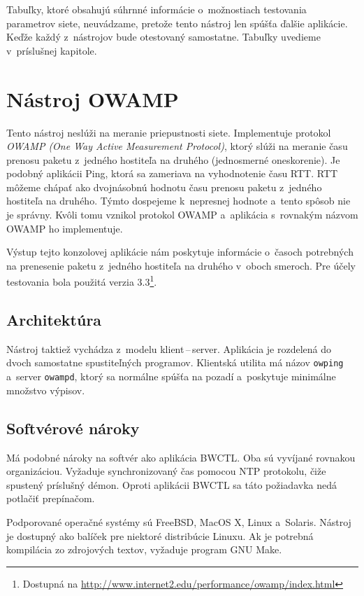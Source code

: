         Tabuľky, ktoré obsahujú súhrnné informácie o~možnostiach testovania
        parametrov siete, neuvádzame, pretože tento nástroj len spúšťa ďalšie 
        aplikácie. Keďže každý z~nástrojov bude otestovaný samostatne. Tabuľky
        uvedieme v~príslušnej kapitole.

    \section{Nástroj OWAMP}
    Tento nástroj neslúži na meranie priepustnosti siete. Implementuje
    protokol \emph{OWAMP (One Way Active Measurement Protocol)}, ktorý slúži na
    meranie času prenosu paketu z~jedného hostiteľa na druhého (jednosmerné
    oneskorenie). Je podobný aplikácii Ping, ktorá sa zameriava na 
    vyhodnotenie času RTT. 
    RTT môžeme chápať ako dvojnásobnú hodnotu času prenosu paketu z~jedného
    hostiteľa na druhého. Týmto dospejeme k~nepresnej hodnote a~tento spôsob nie
    je správny. Kvôli tomu vznikol protokol OWAMP \cite{rfc_owamp}
    a~aplikácia s~rovnakým názvom OWAMP ho implementuje.

    Výstup tejto konzolovej aplikácie nám poskytuje informácie o~časoch
    potrebných na prenesenie paketu z~jedného hostiteľa na druhého v~oboch
    smeroch. 
    Pre účely testovania bola použitá verzia
    3.3\footnote{Dostupná na
    \url{http://www.internet2.edu/performance/owamp/index.html}}.

        \subsection{Architektúra}\label{owamp_arch}
        Nástroj taktiež vychádza z~modelu klient\,--\,server. Aplikácia
        je rozdelená do dvoch samostatne spustiteľných programov.
        Klientská utilita má názov \texttt{owping} a~server \texttt{owampd},
        ktorý sa normálne
        spúšťa na pozadí a~poskytuje minimálne množstvo výpisov.

        \subsection{Softvérové nároky} \label{owamp_sw}
        Má podobné nároky na softvér ako aplikácia BWCTL. Oba sú
        vyvíjané rovnakou organizáciou.
        Vyžaduje synchronizovaný čas pomocou NTP protokolu, čiže spustený
        príslušný démon. Oproti aplikácii BWCTL sa táto požiadavka nedá
        potlačiť prepínačom.

        Podporované operačné systémy sú FreeBSD, MacOS X, Linux a~Solaris. 
        Nástroj je dostupný ako balíček pre niektoré distribúcie Linuxu. Ak je
        potrebná kompilácia zo zdrojových textov, vyžaduje program GNU Make.

